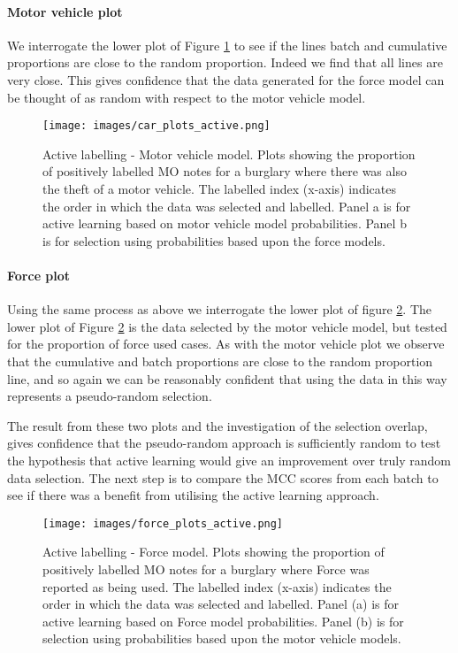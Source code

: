 \paragraph{Motor vehicle plot}We interrogate the lower plot of Figure \ref{fig:active_car} to see if the lines batch and cumulative proportions are close to the random proportion. Indeed we find that all lines are very close. This gives confidence that the data generated for the force model can be thought of as random with respect to the motor vehicle model. 

\begin{figure}[!ht]
  \centering
    \texttt{[image: images/car\_plots\_active.png]}
    \caption[Active labelling - Motor vehicle model. ]{{Active labelling - Motor vehicle model.} Plots showing the proportion of positively labelled MO notes for a burglary where there was also the theft of a motor vehicle. The labelled index (x-axis) indicates the order in which the data was selected and labelled. Panel a is for active learning based on motor vehicle model probabilities. Panel b is for selection using probabilities based upon the force models.}
    \label{fig:active_car}
\end{figure}


\paragraph{Force plot} Using the same process as above we interrogate the lower plot of figure \ref{fig:active_force}. The lower plot of Figure \ref{fig:active_force} is the data selected by the motor vehicle model, but tested for the proportion of force used cases. As with the motor vehicle plot we observe that the cumulative and batch proportions are close to the random proportion line, and so again we can be reasonably confident that using the data in this way represents a pseudo-random selection.

The result from these two plots and the investigation of the selection overlap, gives confidence that the pseudo-random approach is sufficiently random to test the hypothesis that active learning would give an improvement over truly random data selection. The next step is to compare the MCC scores from each batch to see if there was a benefit from utilising the active learning approach.



\begin{figure}[!ht]
  \centering
    \texttt{[image: images/force\_plots\_active.png]}
    \caption[Active labelling - Force model.]{{Active labelling - Force model.} Plots showing the proportion of positively labelled MO notes for a burglary where Force was reported as being used. The labelled index (x-axis) indicates the order in which the data was selected and labelled. Panel (a) is for active learning based on Force model probabilities. Panel (b) is for selection using probabilities based upon the motor vehicle models.}
    \label{fig:active_force}
\end{figure}


